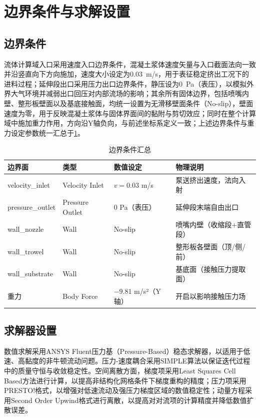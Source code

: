 \section{边界条件与求解设置}

\subsection{边界条件}

流体计算域入口采用速度入口边界条件，混凝土浆体速度矢量与入口截面法向一致并沿竖直向下方向施加，速度大小设定为0.03~m/s，用于表征稳定挤出工况下的进料过程；延伸段出口采用压力出口边界条件，静压设为0~Pa（表压），以模拟外界大气环境并减弱出口回压对内部流场的影响；其余所有固体边界，包括喷嘴内壁、整形板壁面以及基底接触面，均统一设置为无滑移壁面条件（No-slip），壁面速度为零，用于反映混凝土浆体与固体界面间的黏附与剪切效应；同时在整个计算域中施加重力作用，方向沿Y轴负向，与前述坐标系定义一致；上述边界条件与重力设定参数统一汇总于\cref{tab:2.5}。

\begin{table}[!htb]
  \centering
  \caption{边界条件汇总}\label{tab:2.5}
  \renewcommand{\arraystretch}{1.3}
  \begin{tabular}{lllp{4.5cm}}
    \toprule
    \textbf{边界面} & \textbf{类型} & \textbf{数值设定} & \textbf{物理说明} \\
    \midrule
    velocity\_inlet   & Velocity Inlet  & $v = 0.03$ m/s        & 泵送挤出速度，法向入射 \\
    pressure\_outlet  & Pressure Outlet & 0 Pa（表压）          & 延伸段末端自由出口 \\
    wall\_nozzle      & Wall            & No-slip               & 喷嘴内壁（收缩段+直管段） \\
    wall\_trowel      & Wall            & No-slip               & 整形板各壁面（顶/侧/前） \\
    wall\_substrate   & Wall            & No-slip               & 基底面（接触压力提取面） \\
    重力              & Body Force      & $-9.81$ m/s²（Y轴）   & 开启以影响接触压力场 \\
    \bottomrule
  \end{tabular}
\end{table}

\subsection{求解器设置}

数值求解采用ANSYS Fluent压力基（Pressure-Based）稳态求解器，以适用于低速、高黏度的非牛顿流动问题。压力-速度耦合采用SIMPLE算法以保证迭代过程中的质量守恒与收敛稳定性。空间离散方面，梯度项采用Least Squares Cell Based方法进行计算，以提高非结构化网格条件下梯度重构的精度；压力项采用PRESTO!格式，以增强对低速流动及强压力梯度区域的数值稳定性；动量方程采用Second Order Upwind格式进行离散，以提高对对流项的计算精度并降低数值扩散误差。

